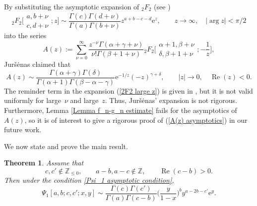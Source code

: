 \documentclass[pdftex]{sigma}
\numberwithin{equation}{section}
\newtheorem{Theorem}{Theorem}[section]
\newcommand{\ZZ}{\ensuremath{\mathbb{Z}}}
\newcommand{\me}{\mathrm{e}}
\begin{document}
\begin{Remark}
	By substituting the asymptotic expansion of $_2F_2$ (see \cite[p.~380]{Paris-2005})
	\begin{equation}\label{2F2 large z}
		{}_2F_2\biggl[\begin{matrix}
			a,b+\nu\\
			c,d+\nu
		\end{matrix};z\biggr]\sim \frac{\Gamma(c)\Gamma(d+\nu)}{\Gamma(a)\Gamma(b+\nu)}z^{a+b-c-d}\me^z,\qquad z\to \infty,\quad|\arg z|<\pi/2
	\end{equation}
	into the series
	\[A(z):=\sum_{\nu=0}^{\infty}\frac{z^{-\nu}\Gamma(\alpha+\gamma+\nu)}{\nu!\Gamma(\beta+1+\nu)}{}_2F_2\biggl[\begin{matrix}
		\alpha+1,\beta+\nu\\
		\delta,\beta+1+\nu
	\end{matrix};-\frac{1}{z}\biggr],\]
	Jur\v{s}\.enas \cite[Section~4.2]{Jursenas-2014} claimed that
	\begin{equation}\label{A(z) asymptotics}
		A(z)\sim \frac{\Gamma(\alpha+\gamma)\Gamma(\delta)}{\Gamma(\alpha+1)\Gamma(\beta-\alpha-\gamma)}\mathrm{e}^{-1/z}(-z)^{\gamma+\delta},\qquad |z|\to 0,\quad\operatorname{Re}(z)<0.
	\end{equation}
	The reminder term in the expansion (\ref{2F2 large z}) is given in \cite{Lin_Wong-2018}, but it is not valid uniformly for large~$\nu$ and large~$z$. Thus, Jur\v{s}\.enas' expansion is not rigorous. Furthermore, Lemma \ref{Lemma f_n-g_n estimate} fails for the asymptotics of $A(z)$, so it is of interest to give a rigorous proof of (\ref{A(z) asymptotics}) in our future work.
\end{Remark}

We now state and prove the main result.

\begin{Theorem}\label{Thm: Psi_1 two large arguments}
	Assume that
	\[c,c'\notin\ZZ_{\leqslant 0},\qquad a-b,a-c\notin\ZZ,\qquad \operatorname{Re}(c-b)>0.\]
	Then under the condition \eqref{Psi_1 asymptotic condition},
	\begin{equation}\label{Thm: Psi_1 two large arguments 1}
		\Psi_1[a,b;c,c';x,y]\sim \frac{\Gamma(c)\Gamma(c')}{\Gamma(a)\Gamma(c-b)}\biggl(\frac{y}{1-x}\biggr)^b y^{a-2b-c'}\me^y.
	\end{equation}
\end{Theorem}
\end{document}
